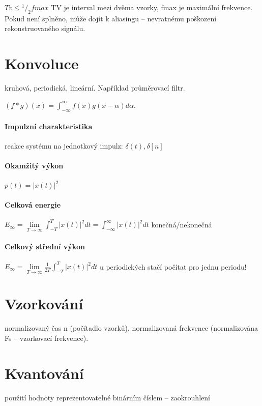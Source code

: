 \documentclass[a4paper, 11pt]{report}
\begin{document}
$Tv \leq {}^1/_2 fmax$ TV je interval mezi dvěma vzorky, fmax je maximální frekvence. Pokud není splněno, může dojít k aliasingu -- nevratnému poškození rekonstruovaného signálu.

\section{Konvoluce}
kruhová, periodická, lineární. Například průměrovací filtr.

$(f * g)(x) = \int_{- \infty}^{\infty} f(x) g(x - \alpha) d \alpha$. 

\paragraph{Impulzní charakteristika} reakce systému na jednotkový impulz: $\delta(t), \delta[n]$

\paragraph{Okamžitý výkon} $p(t) = |x(t)|^2$

\paragraph{Celková energie} $E_\infty = \lim\limits_{T \to \infty} \int_{-T}^{T} |x(t)|^2 dt = \int_{-\infty}^\infty |x(t)|^2 dt$ konečná/nekonečná

\paragraph{Celkový střední výkon} $E_\infty = \lim\limits_{T \to \infty} \frac{1}{2T} \int_{-T}^{T} |x(t)|^2 dt$ u periodických stačí počítat pro jednu periodu!

\section{Vzorkování} normalizovaný čas n (počítadlo vzorků), normalizovaná frekvence (normalizována Fs -- vzorkovací frekvence).
\section{Kvantování} použití hodnoty reprezentovatelné binárním číslem -- zaokrouhlení
\end{document}
